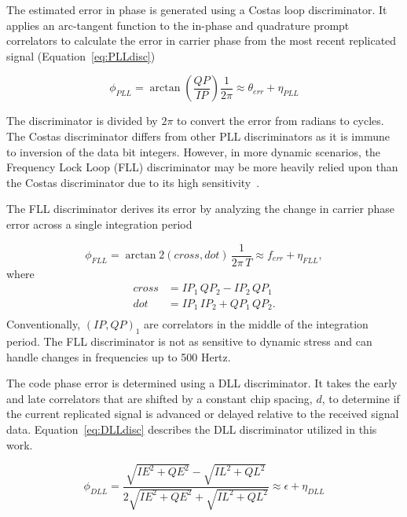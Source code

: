 The estimated error in phase is generated using a Costas loop discriminator. It applies an arc-tangent function to the in-phase and quadrature prompt correlators to calculate the error in carrier phase from the most recent replicated signal (Equation~\ref{eq:PLLdisc})

\begin{equation}\label{eq:PLLdisc}
    \phi_{PLL} = \arctan\left(\frac{QP}{IP}\right) \frac{1}{2\pi} \approx \theta_{err} + \eta_{PLL}
\end{equation}

The discriminator is divided by \(2 \pi \) to convert the error from radians to cycles. The Costas discriminator differs from other PLL discriminators as it is immune to inversion of the data bit integers. However, in more dynamic scenarios, the Frequency Lock Loop (FLL) discriminator may be more heavily relied upon than the Costas discriminator due to its high sensitivity~\cite{kaplanUnderstandingGPSPrinciples2006}.

The FLL discriminator derives its error by analyzing the change in carrier phase error across a single integration period

\begin{equation}\label{eq:FLLdisc}
    \phi_{FLL} = \arctan2\left(cross,dot\right) \, \frac{1}{2\pi \,T} \approx f_{err} + \eta_{FLL},
\end{equation}
where
\begin{equation}\label{eq:crossdot}
    \begin{split}
        cross & = IP_1\,QP_2 - IP_2\,QP_1\\
        dot & = IP_1\,IP_2 + QP_1\,QP_2. \\
    \end{split}
\end{equation}
Conventionally, \({\left(IP,QP\right)}_1\) are correlators in the middle of the integration period. The FLL discriminator is not as sensitive to dynamic stress and can handle changes in frequencies up to 500 Hertz.

The code phase error is determined using a DLL discriminator. It takes the early and late correlators that are shifted by a constant chip spacing, \(d\), to determine if the current replicated signal is advanced or delayed relative to the received signal data. Equation~\ref{eq:DLLdisc} describes the DLL discriminator utilized in this work.

\begin{equation}\label{eq:DLLdisc}
    \phi_{DLL} = \frac{\sqrt{IE^2 + QE^2} - \sqrt{IL^2 + QL^2}}{2 \sqrt{IE^2 + QE^2} + \sqrt{IL^2 + QL^2}} \approx \epsilon + \eta_{DLL}
\end{equation}

